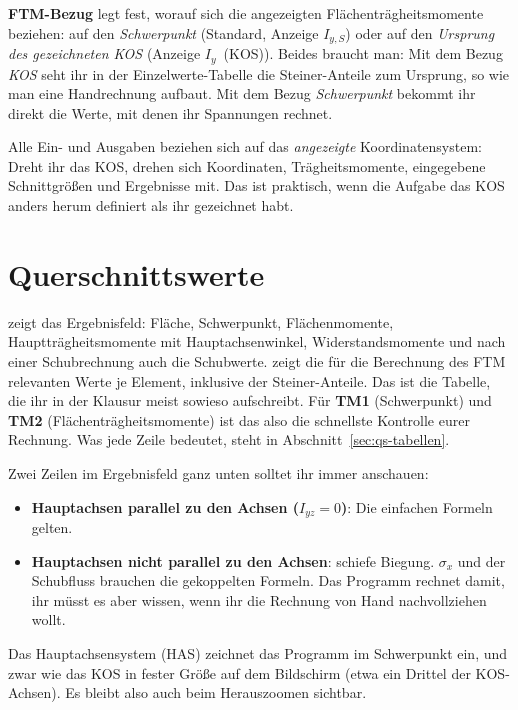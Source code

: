 \textbf{FTM-Bezug} legt fest, worauf sich die angezeigten Flächenträgheitsmomente beziehen: auf
den \emph{Schwerpunkt} (Standard, Anzeige $I_{y,S}$) oder auf den \emph{Ursprung des gezeichneten
KOS} (Anzeige $I_y$~(KOS)). Beides braucht man: Mit dem Bezug \emph{KOS} seht ihr in der
Einzelwerte-Tabelle die Steiner-Anteile zum Ursprung, so wie man eine Handrechnung aufbaut. Mit
dem Bezug \emph{Schwerpunkt} bekommt ihr direkt die Werte, mit denen ihr Spannungen rechnet.

Alle Ein- und Ausgaben beziehen sich auf das \emph{angezeigte} Koordinatensystem: Dreht ihr das
KOS, drehen sich Koordinaten, Trägheitsmomente, eingegebene Schnittgrößen und Ergebnisse mit.
Das ist praktisch, wenn die Aufgabe das KOS anders herum definiert als ihr gezeichnet habt.

\section{Querschnittswerte}\label{sec:qs-werte}

 zeigt das Ergebnisfeld: Fläche, Schwerpunkt, Flächenmomente, Hauptträgheitsmomente mit
Hauptachsenwinkel, Widerstandsmomente und nach einer Schubrechnung auch die Schubwerte.
 zeigt die für die Berechnung des FTM relevanten
Werte je Element, inklusive der Steiner-Anteile. Das ist die Tabelle,
die ihr in der Klausur meist sowieso aufschreibt. Für \textbf{TM1} (Schwerpunkt) und \textbf{TM2}
(Flächenträgheitsmomente) ist das also die schnellste Kontrolle eurer Rechnung. Was jede Zeile
bedeutet, steht in Abschnitt~\ref{sec:qs-tabellen}.

Zwei Zeilen im Ergebnisfeld ganz unten solltet ihr immer anschauen:

\begin{itemize}
  \item \textcolor{green!50!black}{\textbf{Hauptachsen parallel zu den Achsen ($I_{yz} = 0$)}}:
        Die einfachen Formeln gelten.
  \item \textcolor{orange!80!black}{\textbf{Hauptachsen nicht parallel zu den Achsen}}:
        schiefe Biegung. $\sigma_x$ und der Schubfluss brauchen die gekoppelten Formeln. Das
        Programm rechnet damit, ihr müsst es aber wissen, wenn ihr die Rechnung von Hand
        nachvollziehen wollt.
\end{itemize}

Das Hauptachsensystem (HAS) zeichnet das Programm im Schwerpunkt ein, und zwar wie das KOS in
fester Größe auf dem Bildschirm (etwa ein Drittel der KOS-Achsen). Es bleibt also auch beim
Herauszoomen sichtbar.

